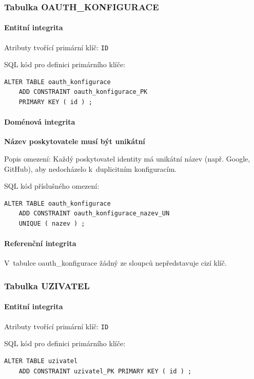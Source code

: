 \documentclass[12pt,a4paper]{article}
\begin{document}
\subsubsection{Tabulka OAUTH\_KONFIGURACE}

\paragraph{Entitní integrita}
Atributy tvořící primární klíč: \texttt{ID}

SQL kód pro definici primárního klíče:
\begin{lstlisting}
ALTER TABLE oauth_konfigurace
    ADD CONSTRAINT oauth_konfigurace_PK
    PRIMARY KEY ( id ) ;
\end{lstlisting}

\paragraph{Doménová integrita}

\textbf{Název poskytovatele musí být unikátní}

Popis omezení: Každý poskytovatel identity má unikátní název (např. Google, GitHub), aby
nedocházelo k~duplicitním konfiguracím.

SQL kód příslušného omezení:
\begin{lstlisting}
ALTER TABLE oauth_konfigurace
    ADD CONSTRAINT oauth_konfigurace_nazev_UN
    UNIQUE ( nazev ) ;
\end{lstlisting}

\paragraph{Referenční integrita}
V~tabulce oauth\_konfigurace žádný ze sloupců nepředstavuje cizí klíč.

\subsubsection{Tabulka UZIVATEL}

\paragraph{Entitní integrita}
Atributy tvořící primární klíč: \texttt{ID}

SQL kód pro definici primárního klíče:
\begin{lstlisting}
ALTER TABLE uzivatel
    ADD CONSTRAINT uzivatel_PK PRIMARY KEY ( id ) ;
\end{lstlisting}
\end{document}
